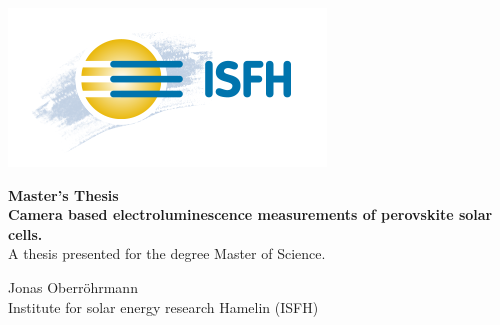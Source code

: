 \begin{titlepage}
\begin{center}
	

\begin{minipage}[t]{0.05\linewidth}
	
\end{minipage}
\hfill
\begin{minipage}[t]{0.4\linewidth}
	\includegraphics[width=\linewidth]{Images/titlepage/isfh_logo}
\end{minipage}
\vspace{1.5cm}

\huge
\textbf{Master's Thesis} \\
\vspace{0.5cm}
\large
\textbf{Camera based electroluminescence measurements of perovskite solar cells.}\\

A thesis presented for the degree Master of Science.
\vfill

Jonas Oberröhrmann \\
Institute for solar energy research Hamelin (ISFH)

\pagestyle{empty} %
\setcounter{page}{0} %

\end{center}	
\end{titlepage}

\newpage 

